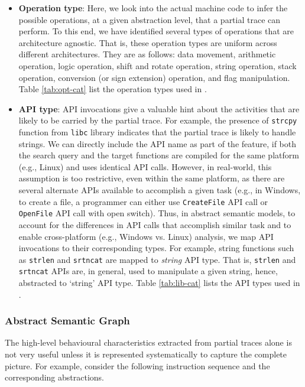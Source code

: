 \begin{itemize}

\item \textbf{Operation type}: Here, we look into the actual machine code to infer the possible operations, at a given abstraction level, that a partial trace can perform. To this end, we have identified several types of operations that are architecture agnostic. That is, these operation types are uniform across different architectures. They are as follows: data movement, arithmetic operation, logic operation, shift and rotate operation, string operation, 
stack operation, conversion (or sign extension) operation, 
and flag manipulation. Table \ref{tab:opt-cat} list the operation types used in \tool.

\item \textbf{API type}: API invocations give a valuable hint about the activities that are likely to be carried by the partial trace. For example, the presence of \texttt{strcpy} function from \texttt{libc} library indicates that the partial trace is likely to handle strings. We can directly include the API name as part of the feature, if both the search query and the target functions are compiled for the same platform (e.g., Linux) and uses identical API calls. However, in real-world, this assumption is too restrictive, even within the same platform, as there are several alternate APIs available to accomplish a given task  (e.g., in Windows, to create a file, a programmer can either use \texttt{CreateFile} API call or \texttt{OpenFile} API call with open switch).  Thus, in abstract semantic models, to account for the differences in API calls that accomplish similar task and to enable cross-platform (e.g., Windows vs. Linux) analysis, we map API invocations to their corresponding types. For example, string functions such as \texttt{strlen} and \texttt{srtncat} are mapped to \textit{string} API type. That is, \texttt{strlen} and \texttt{srtncat} APIs are, in general, used to manipulate a given string, hence, abstracted to `string' API type. Table \ref{tab:lib-cat} lists the API types used in \tool.
\end{itemize}

\subsubsection{Abstract Semantic Graph} 
The high-level behavioural characteristics extracted from partial traces alone is not very useful unless it is represented systematically to capture the complete picture. For example, consider the following instruction sequence and the corresponding abstractions.

